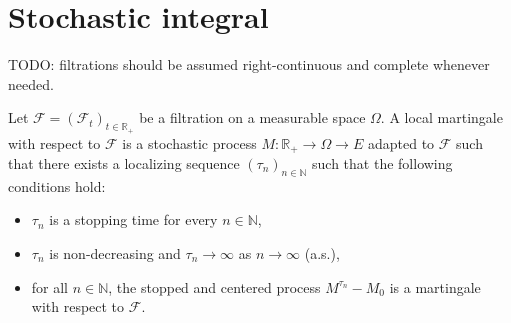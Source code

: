 \chapter{Stochastic integral}

TODO: filtrations should be assumed right-continuous and complete whenever needed.

\begin{definition}\label{def:localMartingale}
Let $\mathcal{F} = (\mathcal{F}_t)_{t \in \mathbb{R}_+}$ be a filtration on a measurable space $\Omega$.
A local martingale with respect to $\mathcal{F}$ is a stochastic process $M : \mathbb{R}_+ \to \Omega \to E$ adapted to $\mathcal{F}$ such that there exists a localizing sequence $(\tau_n)_{n \in \mathbb{N}}$ such that the following conditions hold:
\begin{itemize}
  \item $\tau_n$ is a stopping time for every $n \in \mathbb{N}$,
  \item $\tau_n$ is non-decreasing and $\tau_n \to \infty$ as $n \to \infty$ (a.s.),
  \item for all $n \in \mathbb{N}$, the stopped and centered process $M^{\tau_n} - M_0$ is a martingale with respect to $\mathcal{F}$.
\end{itemize}
\end{definition}

